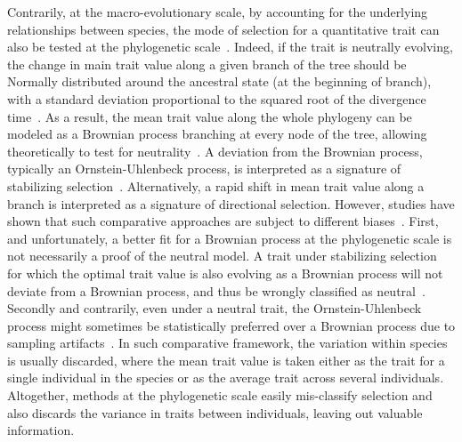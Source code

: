 \documentclass{article}
\begin{document}
Contrarily, at the macro-evolutionary scale, by accounting for the underlying relationships between species, the mode of selection for a quantitative trait can also be tested at the phylogenetic scale~\cite{felsenstein_phylogenies_1985}.
Indeed, if the trait is neutrally evolving, the change in main trait value along a given branch of the tree should be Normally distributed around the ancestral state (at the beginning of branch), with a standard deviation proportional to the squared root of the divergence time~\cite{hansen_translating_1996}.
As a result, the mean trait value along the whole phylogeny can be modeled as a Brownian process branching at every node of the tree, allowing theoretically to test for neutrality~\cite{hansen_translating_1996, harmon_phylogenetic_2018}.
A deviation from the Brownian process, typically an Ornstein-Uhlenbeck process, is interpreted as a signature of stabilizing selection~\cite{catalan_drift_2019}.
Alternatively, a rapid shift in mean trait value along a branch is interpreted as a signature of directional selection.
However, studies have shown that such comparative approaches are subject to different biases~\cite{harmon_phylogenetic_2018}.
First, and unfortunately, a better fit for a Brownian process at the phylogenetic scale is not necessarily a proof of the neutral model.
A trait under stabilizing selection for which the optimal trait value is also evolving as a Brownian process will not deviate from a Brownian process, and thus be wrongly classified as neutral~\cite{hansen_translating_1996}.
Secondly and contrarily, even under a neutral trait, the Ornstein-Uhlenbeck process might sometimes be statistically preferred over a Brownian process due to sampling artifacts~\cite{silvestro_measurement_2015, cooper_cautionary_2016, price_detecting_2022}.
In such comparative framework, the variation within species is usually discarded, where the mean trait value is taken either as the trait for a single individual in the species or as the average trait across several individuals.
Altogether, methods at the phylogenetic scale easily mis-classify selection and also discards the variance in traits between individuals, leaving out valuable information.
\end{document}
